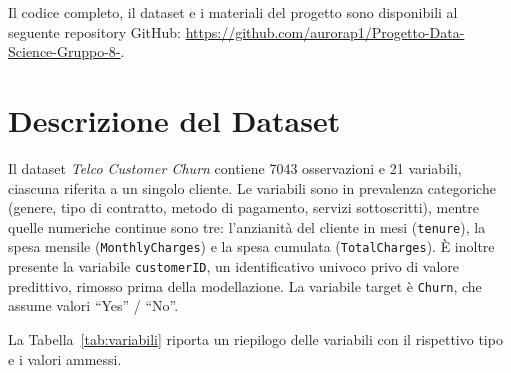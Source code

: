 \documentclass[11pt]{article}
\begin{document}
Il codice completo, il dataset e i materiali del progetto sono disponibili al seguente repository GitHub: \url{https://github.com/aurorap1/Progetto-Data-Science-Gruppo-8-}.

\section{Descrizione del Dataset}
\label{sec:dataset}

Il dataset \emph{Telco Customer Churn} contiene 7043 osservazioni e 21 variabili, ciascuna riferita a un singolo cliente. Le variabili sono in prevalenza categoriche (genere, tipo di contratto, metodo di pagamento, servizi sottoscritti), mentre quelle numeriche continue sono tre: l'anzianità del cliente in mesi (\texttt{tenure}), la spesa mensile (\texttt{MonthlyCharges}) e la spesa cumulata (\texttt{TotalCharges}). È inoltre presente la variabile \texttt{customerID}, un identificativo univoco privo di valore predittivo, rimosso prima della modellazione. La variabile target è \texttt{Churn}, che assume valori ``Yes'' / ``No''.

La Tabella~\ref{tab:variabili} riporta un riepilogo delle variabili con il rispettivo tipo e i valori ammessi.
\end{document}

